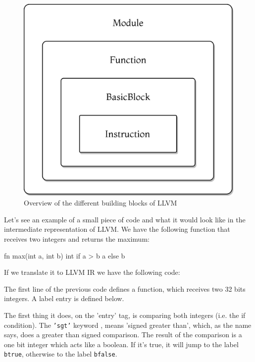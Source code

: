 ﻿\documentclass[10pt,a4paper,twocolumn,twoside]{article}
\begin{document}
\begin{figure}[ht]
\centering
\captionsetup{justification=centering,margin=1cm}
\includegraphics[width=0.65\linewidth]{llvm-blocks}
\caption{Overview of the different building blocks of LLVM}
\end{figure}

Let's see an example of a small piece of code and what it would look like in the
intermediate representation of LLVM. We have the following function that
receives two integers and returns the maximum:

\begin{code}
fn max(int a, int b) int {
    if a > b { a } else { b }
}
\end{code}

If we translate it to LLVM IR we have the following code:


The first line of the previous code defines a function, which receives two
32 bits integers. A label entry is defined below.

The first thing it does, on the 'entry' tag, is comparing both integers (i.e.
the if condition). The \texttt{'sgt'} keyword \cite{sgt}, means 'signed greater
than', which, as the name says, does a greater than signed comparison. The
result of the comparison is a one bit integer which acts like a boolean. If it's
true, it will jump to the label \texttt{btrue}, otherwise to the label
\texttt{bfalse}.
\end{document}
